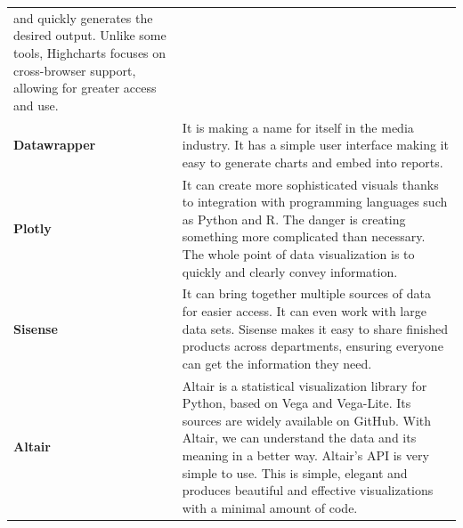 \documentclass[]{book}
\theoremstyle{definition}
\theoremstyle{definition}
\theoremstyle{definition}
\theoremstyle{remark}
\begin{document}
\begin{longtable}[]{@{}ll@{}}
\begin{minipage}[t]{0.78\columnwidth}
and quickly generates the desired output. Unlike some tools, Highcharts
focuses on cross-browser support, allowing for greater access and
use.\strut
\end{minipage}\tabularnewline
\begin{minipage}[t]{0.16\columnwidth}\raggedright\strut
\textbf{Datawrapper}\strut
\end{minipage} & \begin{minipage}[t]{0.78\columnwidth}\raggedright\strut
It is making a name for itself in the media industry. It has a simple
user interface making it easy to generate charts and embed into
reports.\strut
\end{minipage}\tabularnewline
\begin{minipage}[t]{0.16\columnwidth}\raggedright\strut
\textbf{Plotly}\strut
\end{minipage} & \begin{minipage}[t]{0.78\columnwidth}\raggedright\strut
It can create more sophisticated visuals thanks to integration with
programming languages such as Python and R. The danger is creating
something more complicated than necessary. The whole point of data
visualization is to quickly and clearly convey information.\strut
\end{minipage}\tabularnewline
\begin{minipage}[t]{0.16\columnwidth}\raggedright\strut
\textbf{Sisense}\strut
\end{minipage} & \begin{minipage}[t]{0.78\columnwidth}\raggedright\strut
It can bring together multiple sources of data for easier access. It can
even work with large data sets. Sisense makes it easy to share finished
products across departments, ensuring everyone can get the information
they need.\strut
\end{minipage}\tabularnewline
\begin{minipage}[t]{0.16\columnwidth}\raggedright\strut
\textbf{Altair}\strut
\end{minipage} & \begin{minipage}[t]{0.78\columnwidth}\raggedright\strut
Altair is a statistical visualization library for Python, based on Vega
and Vega-Lite. Its sources are widely available on GitHub. With Altair,
we can understand the data and its meaning in a better way. Altair's API
is very simple to use. This is simple, elegant and produces beautiful
and effective visualizations with a minimal amount of code.\strut
\end{minipage}\tabularnewline
\bottomrule
\end{longtable}
\end{document}
